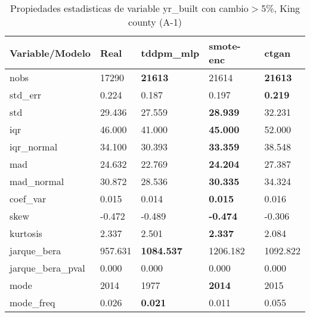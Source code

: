 \begin{table}[H]
\centering
\fontsize{8}{14}\selectfont
\caption{Propiedades estadisticas de variable yr\_built con cambio\ensuremath{>}5\%, King county (A-1)}
\label{table-stats-king county-a-1-yr_built-short}
\begin{tabular}{|l|m{10em}|m{10em}|m{10em}|m{10em}|}
\hline
 \rowcolor[gray]{0.8}
Variable/Modelo & Real & tddpm\_mlp & smote-enc & ctgan \\
\hline nobs & 17290 & \bfseries 21613 & \cellcolor[rgb]{0.9, 0.54, 0.52} 21614 & \bfseries 21613 \\
\hline std\_err & 0.224 & \cellcolor[rgb]{0.9, 0.54, 0.52} 0.187 & 0.197 & \bfseries 0.219 \\
\hline std & 29.436 & 27.559 & \bfseries 28.939 & \cellcolor[rgb]{0.9, 0.54, 0.52} 32.231 \\
\hline iqr & 46.000 & 41.000 & \bfseries 45.000 & \cellcolor[rgb]{0.9, 0.54, 0.52} 52.000 \\
\hline iqr\_normal & 34.100 & 30.393 & \bfseries 33.359 & \cellcolor[rgb]{0.9, 0.54, 0.52} 38.548 \\
\hline mad & 24.632 & 22.769 & \bfseries 24.204 & \cellcolor[rgb]{0.9, 0.54, 0.52} 27.387 \\
\hline mad\_normal & 30.872 & 28.536 & \bfseries 30.335 & \cellcolor[rgb]{0.9, 0.54, 0.52} 34.324 \\
\hline coef\_var & 0.015 & 0.014 & \bfseries 0.015 & \cellcolor[rgb]{0.9, 0.54, 0.52} 0.016 \\
\hline skew & -0.472 & -0.489 & \bfseries -0.474 & \cellcolor[rgb]{0.9, 0.54, 0.52} -0.306 \\
\hline kurtosis & 2.337 & 2.501 & \bfseries 2.337 & \cellcolor[rgb]{0.9, 0.54, 0.52} 2.084 \\
\hline jarque\_bera & 957.631 & \bfseries 1084.537 & \cellcolor[rgb]{0.9, 0.54, 0.52} 1206.182 & 1092.822 \\
\hline jarque\_bera\_pval & 0.000 & 0.000 & 0.000 & 0.000 \\
\hline mode & 2014 & \cellcolor[rgb]{0.9, 0.54, 0.52} 1977 & \bfseries 2014 & 2015 \\
\hline mode\_freq & 0.026 & \bfseries 0.021 & 0.011 & \cellcolor[rgb]{0.9, 0.54, 0.52} 0.055 \\
\hline
\end{tabular}
\end{table}

